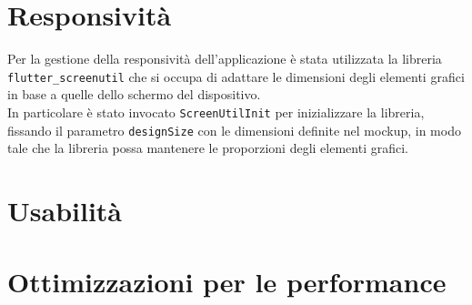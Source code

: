 \section{Responsività}
\label{sec:responsivity}

Per la gestione della responsività dell'applicazione è stata utilizzata la libreria \lstinline{flutter_screenutil}\cite{site:screenutil} che si occupa di adattare le dimensioni degli elementi grafici in base a quelle dello schermo del dispositivo. \\
In particolare è stato invocato \lstinline{ScreenUtilInit} per inizializzare la libreria, fissando il parametro \lstinline{designSize} con le dimensioni definite nel \gls{mockup}\glsoccur, in modo tale che la libreria possa mantenere le proporzioni degli elementi grafici. 

\section{Usabilità}
\label{sec:usability}


\section{Ottimizzazioni per le performance}
\label{sec:performance}




